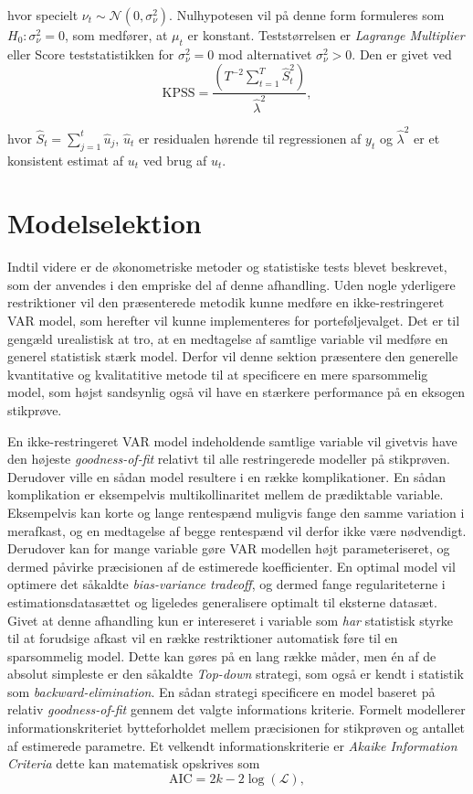 \documentclass[
  a4paper,
  oneside]{memoir}
\begin{document}
hvor specielt \(\nu_t\sim\mathcal{N}(0,\sigma_\nu ^2)\). Nulhypotesen vil på denne form formuleres som \(H_0:\sigma_\nu^2=0\), som medfører, at \(\mu_t\) er konstant. Teststørrelsen er \emph{Lagrange Multiplier} eller Score teststatistikken for \(\sigma_\nu ^2=0\) mod alternativet \(\sigma_\nu ^2>0\). Den er givet ved
\[\text{KPSS}=\frac{(T^{-2} \sum_{t=1}^T \hat{S}_t^2)}{\hat{\lambda}^2},\]

hvor \(\hat{S}_t=\sum_{j=1}^t \hat{u}_j\), \(\hat{u}_t\) er residualen hørende til regressionen af \(y_t\) og \(\hat{\lambda}^2\) er et konsistent estimat af \(u_t\) ved brug af \(\hat{u}_t\).

\hypertarget{sekmodelselek}{%
\section{Modelselektion}\label{sekmodelselek}}

Indtil videre er de økonometriske metoder og statistiske tests blevet beskrevet, som der anvendes i den empriske del af denne afhandling. Uden nogle yderligere restriktioner vil den præsenterede metodik kunne medføre en ikke-restringeret VAR model, som herefter vil kunne implementeres for porteføljevalget. Det er til gengæld urealistisk at tro, at en medtagelse af samtlige variable vil medføre en generel statistisk stærk model. Derfor vil denne sektion præsentere den generelle kvantitative og kvalitatitive metode til at specificere en mere sparsommelig model, som højst sandsynlig også vil have en stærkere performance på en eksogen stikprøve.

En ikke-restringeret VAR model indeholdende samtlige variable vil givetvis have den højeste \emph{goodness-of-fit} relativt til alle restringerede modeller på stikprøven. Derudover ville en sådan model resultere i en række komplikationer. En sådan komplikation er eksempelvis multikollinaritet mellem de prædiktable variable. Eksempelvis kan korte og lange rentespænd muligvis fange den samme variation i merafkast, og en medtagelse af begge rentespænd vil derfor ikke være nødvendigt. Derudover kan for mange variable gøre VAR modellen højt parameteriseret, og dermed påvirke præcisionen af de estimerede koefficienter. En optimal model vil optimere det såkaldte \emph{bias-variance tradeoff}, og dermed fange regulariteterne i estimationsdatasættet og ligeledes generalisere optimalt til eksterne datasæt. Givet at denne afhandling kun er intereseret i variable som \emph{har} statistisk styrke til at forudsige afkast vil en række restriktioner automatisk føre til en sparsommelig model. Dette kan gøres på en lang række måder, men én af de absolut simpleste er den såkaldte \emph{Top-down} strategi, som også er kendt i statistik som \emph{backward-elimination}. En sådan strategi specificere en model baseret på relativ \emph{goodness-of-fit} gennem det valgte informations kriterie. Formelt modellerer informationskriteriet bytteforholdet mellem præcisionen for stikprøven og antallet af estimerede parametre. Et velkendt informationskriterie er \emph{Akaike Information Criteria} dette kan matematisk opskrives som
\[\text{AIC}=2k-2\log(\mathcal{L}),\]
\end{document}
